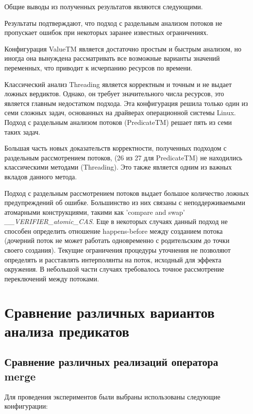
Общие выводы из полученных результатов являются следующими.

Результаты подтверждают, что подход с раздельным анализом потоков не пропускает ошибок при некоторых заранее известных ограничениях.

Конфигурация ValueTM является достаточно простым и быстрым анализом, но иногда она вынуждена рассматривать все возможные варианты значений переменных, что приводит к исчерпанию ресурсов по времени.

Классический анализ Threading является корректным и точным и не выдает ложных вердиктов.
Однако, он требует значительного числа ресурсов, это является главным недостатком подхода.
Эта конфигурация решила только один из семи сложных задач, основанных на драйверах операционной системы Linux.
Подход с раздельным анализом потоков (PredicateTM) решает пять из семи таких задач. 

Большая часть новых доказательств корректности, полученных подходом с раздельным рассмотрением потоков, (26 из 27 для PredicateTM) не находились классическими методами (Threading). Это также является одним из важных вкладов данного метода.

Подход с раздельным рассмотрением потоков выдает большое количество ложных предупреждений об ошибке. 
Большинство из них связаны с неподдерживаемыми атомарными конструкциями, такими как 'compare and swap' {\em \_\_VERIFIER\_atomic\_CAS}.
Еще в некоторых случаях данный подход не способен определить отношение happens-before между созданием потока (дочерний поток не может работать одновременно с родительским до точки своего создания).
Текущие ограничения процедуры уточнения не позволяют определять и расставлять интерполянты на поток, исходный для эффекта окружения.
В небольшой части случаях требовалось точное рассмотрение переключений между потоками.

\section{Сравнение различных вариантов анализа предикатов}

\subsection{Сравнение различных реализаций оператора merge}

Для проведения экспериментов были выбраны использованы следующие конфигурации:

